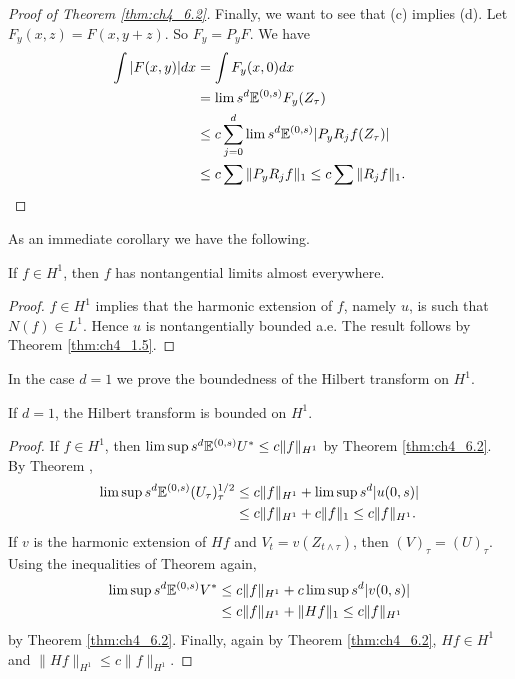 \begin{proof}[Proof of Theorem \ref{thm:ch4_6.2}]
Finally, we want to see that (c) implies (d). Let $F_y(x,z) = F(x,y+z)$. So $F_y = P_yF$. We have
\begin{align*}
    \int |F(x,y)|dx &= \int F_y(x,0)dx \\
    &= \lim s^d\mathbb{E}^{(0,s)}F_y(Z_\tau) \\
    &\leq c\sum_{j=0}^d \lim s^d\mathbb{E}^{(0,s)}|P_yR_j f(Z_\tau)| \\
    &\leq c\sum \|P_yR_j f\|_1 \leq c\sum \|R_j f\|_1.
\end{align*}
\end{proof}

As an immediate corollary we have the following.

\begin{theorem}\label{thm:ch4_6.10}
If $f \in H^1$, then $f$ has nontangential limits almost everywhere.
\end{theorem}

\begin{proof}
$f \in H^1$ implies that the harmonic extension of $f$, namely $u$, is such that $N(f) \in L^1$. Hence $u$ is nontangentially bounded a.e. The result follows by Theorem \ref{thm:ch4_1.5}.
\end{proof}

\mpagebreak

In the case $d=1$ we prove the boundedness of the Hilbert transform on $H^1$.

\begin{proposition}\label{prop:ch4_6.11}
If $d = 1$, the Hilbert transform is bounded on $H^1$.
\end{proposition}

\begin{proof}
If $f \in H^1$, then $\limsup s^d\mathbb{E}^{(0,s)}U^* \leq c\|f\|_{H^1}$ by Theorem \ref{thm:ch4_6.2}. By Theorem ,
\begin{align*}
    \limsup s^d\mathbb{E}^{(0,s)}(U_\tau)_\tau^{1/2} &\leq c\|f\|_{H^1} + \limsup s^d|u(0,s)| \\
    &\leq c\|f\|_{H^1} + c\|f\|_1 \leq c\|f\|_{H^1}.
\end{align*}
If $v$ is the harmonic extension of $Hf$ and $V_t = v(Z_{t\wedge\tau})$, then $(V)_\tau = (U)_\tau$. Using the inequalities of Theorem  again,
\begin{align*}
    \limsup s^d\mathbb{E}^{(0,s)}V^* &\leq c\|f\|_{H^1} + c\limsup s^d|v(0,s)| \\
    &\leq c\|f\|_{H^1} + \|Hf\|_1 \leq c\|f\|_{H^1}
\end{align*}
by Theorem \ref{thm:ch4_6.2}. Finally, again by Theorem \ref{thm:ch4_6.2}, $Hf \in H^1$ and $\|Hf\|_{H^1} \leq c\|f\|_{H^1}$.
\end{proof}

